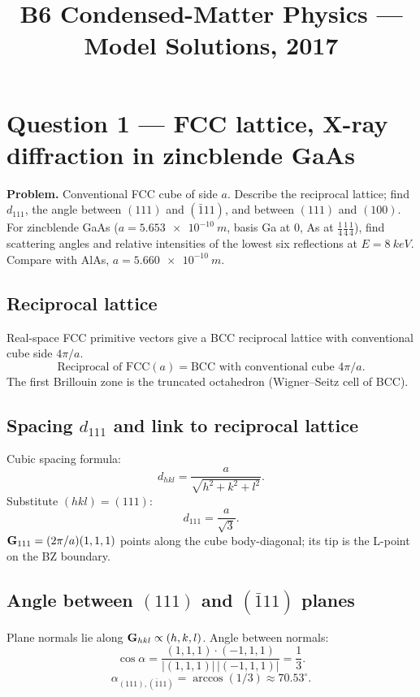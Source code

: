 \documentclass[11pt]{article}
\title{B6 Condensed-Matter Physics --- Model Solutions, 2017}
\author{}
\date{}
\begin{document}
\maketitle

\section*{Question 1 --- FCC lattice, X-ray diffraction in zincblende GaAs}

\textbf{Problem.} Conventional FCC cube of side $a$. Describe the reciprocal lattice; find $d_{111}$, the angle between $(111)$ and $(\bar1 1 1)$, and between $(111)$ and $(100)$. For zincblende GaAs ($a=\SI{5.653e-10}{m}$, basis Ga at $0$, As at $\tfrac14\tfrac14\tfrac14$), find scattering angles and relative intensities of the lowest six reflections at $E=\SI{8}{keV}$. Compare with AlAs, $a=\SI{5.660e-10}{m}$.

\subsection*{Reciprocal lattice}

Real-space FCC primitive vectors give a BCC reciprocal lattice with conventional cube side $4\pi/a$.
\[
\boxed{\;\text{Reciprocal of FCC}(a) = \text{BCC with conventional cube }4\pi/a.\;}
\]
The first Brillouin zone is the truncated octahedron (Wigner--Seitz cell of BCC).

\subsection*{Spacing $d_{111}$ and link to reciprocal lattice}

Cubic spacing formula:
\[ d_{hkl}=\frac{a}{\sqrt{h^{2}+k^{2}+l^{2}}}. \]
Substitute $(hkl)=(111)$:
\[ \boxed{\;d_{111}=\frac{a}{\sqrt{3}}.\;} \]
$\vb G_{111}=(2\pi/a)(1,1,1)$ points along the cube body-diagonal; its tip is the L-point on the BZ boundary.

\subsection*{Angle between $(111)$ and $(\bar 1 1 1)$ planes}

Plane normals lie along $\vb G_{hkl}\propto(h,k,l)$. Angle between normals:
\[ \cos\alpha = \frac{(1,1,1)\cdot(-1,1,1)}{|(1,1,1)|\,|(-1,1,1)|} = \frac{1}{3}. \]
\[ \boxed{\;\alpha_{(111),(\bar1 1 1)} = \arccos(1/3) \approx 70.53^{\circ}.\;} \]
\end{document}
